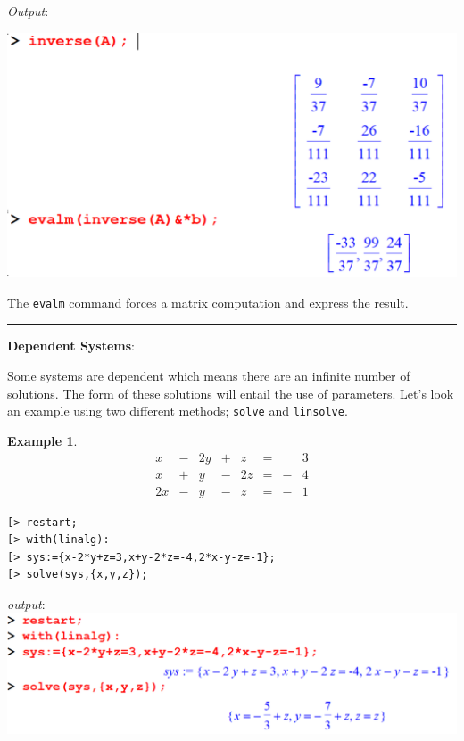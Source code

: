 \documentclass[
]{book}
\theoremstyle{definition}
\theoremstyle{definition}
\newtheorem{example}{Example}[chapter]
\theoremstyle{definition}
\theoremstyle{definition}
\theoremstyle{remark}
\begin{document}
\emph{Output}:

\includegraphics{figures/Lesson 5/fig8.png}

The \texttt{evalm} command forces a matrix computation and express the result.

\begin{center}\rule{0.5\linewidth}{0.5pt}\end{center}

\textbf{Dependent Systems}:

Some systems are dependent which means there are an infinite number of solutions. The form of these solutions will entail the use of parameters.
Let's look an example using two different methods; \texttt{solve} and \texttt{linsolve}.

\begin{example}
\protect\hypertarget{exm:unnamed-chunk-1}{}\label{exm:unnamed-chunk-1}\[
\begin{array}{ccccccccc}
x &-& 2y&+& z &=& &3\\
x &+& y &-& 2z&=&-&4\\
2x&-& y &-& z &=&-&1  
\end{array}
\]
\end{example}

\begin{verbatim}
[> restart;
[> with(linalg):
[> sys:={x-2*y+z=3,x+y-2*z=-4,2*x-y-z=-1};
[> solve(sys,{x,y,z});
\end{verbatim}

\emph{output}:
\includegraphics{figures/Lesson 5/fig9.png}
\end{document}
